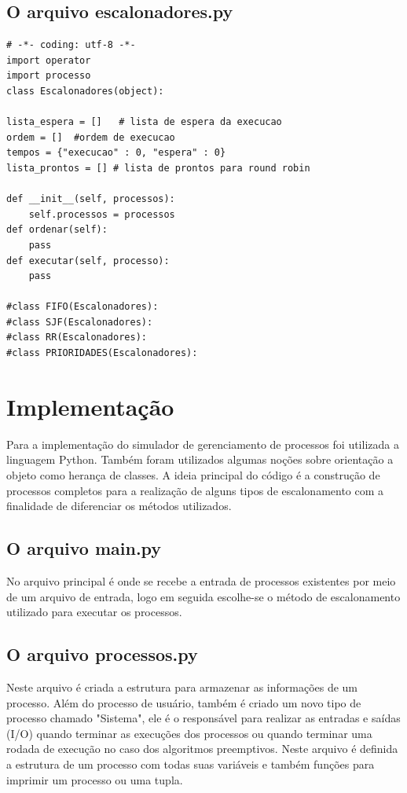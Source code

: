 \documentclass[times, 10pt,twocolumn]{article}
\begin{document}
\subsection{O arquivo escalonadores.py} 
\begin{lstlisting}
# -*- coding: utf-8 -*-
import operator
import processo
class Escalonadores(object):

lista_espera = []   # lista de espera da execucao
ordem = []  #ordem de execucao
tempos = {"execucao" : 0, "espera" : 0}
lista_prontos = [] # lista de prontos para round robin   

def __init__(self, processos):
	self.processos = processos
def ordenar(self):
	pass
def executar(self, processo):
	pass

#class FIFO(Escalonadores):
#class SJF(Escalonadores): 
#class RR(Escalonadores): 
#class PRIORIDADES(Escalonadores):
\end{lstlisting} 

  
\section{Implementação} 
Para a implementação do simulador de gerenciamento de processos foi utilizada a linguagem Python. Também foram utilizados algumas noções sobre orientação a objeto como herança de classes. A ideia principal do código é a construção de processos completos para a realização de alguns tipos de escalonamento com a finalidade de diferenciar os métodos utilizados.   
\subsection{O arquivo main.py}
No arquivo principal é onde se recebe a entrada de processos existentes por meio de um arquivo de entrada, logo em seguida escolhe-se o método de escalonamento utilizado para executar os processos.   
\subsection{O arquivo processos.py} 
Neste arquivo é criada a estrutura para armazenar as informações de um processo. Além do processo de usuário, também é criado um novo tipo de processo chamado "Sistema", ele é o responsável para realizar as entradas e saídas (I/O) quando terminar as execuções dos processos ou quando terminar uma rodada de execução no caso dos algoritmos preemptivos. Neste arquivo é definida a estrutura de um processo com todas suas variáveis e também funções para imprimir um processo ou uma tupla.
\end{document}
